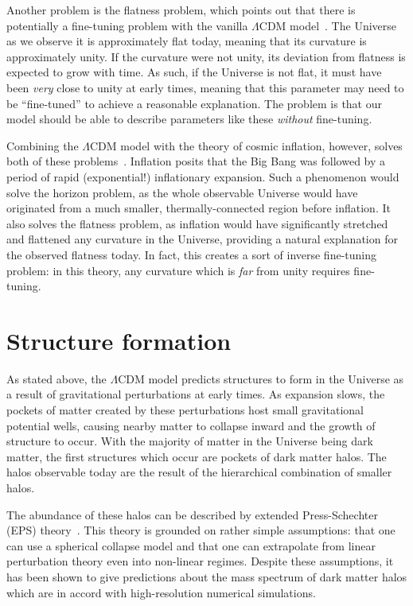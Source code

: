 Another problem is the flatness problem, which points out that there is
potentially a fine-tuning problem with the vanilla \(\Lambda\)CDM
model~\cite{bergstrom_cosmology_2008,schneider_extragalactic_2015}. The
Universe as we observe it is approximately flat today, meaning that its
curvature is approximately unity. If the curvature were not unity, its
deviation from flatness is expected to grow with time. As such, if the
Universe is not flat, it must have been \emph{very} close to unity at early
times, meaning that this parameter may need to be ``fine-tuned'' to achieve a
reasonable explanation. The problem is that our model should be able to
describe parameters like these \emph{without} fine-tuning.

Combining the \(\Lambda\)CDM model with the theory of cosmic inflation,
however, solves both of these problems~\cite{bergstrom_cosmology_2008}.
Inflation posits that the Big Bang was followed by a period of rapid
(exponential!) inflationary expansion. Such a phenomenon would solve the
horizon problem, as the whole observable Universe would have originated from a
much smaller, thermally-connected region before inflation. It also solves the
flatness problem, as inflation would have significantly stretched and
flattened any curvature in the Universe, providing a natural explanation for
the observed flatness today. In fact, this creates a sort of inverse
fine-tuning problem: in this theory, any curvature which is \emph{far} from
unity requires fine-tuning.

\hypertarget{structure-formation}{%
\section{Structure formation}\label{structure-formation}}

As stated above, the \(\Lambda\)CDM model predicts structures to form in
the Universe as a result of gravitational perturbations at early times.
As expansion slows, the pockets of matter created by these perturbations
host small gravitational potential wells, causing nearby matter to
collapse inward and the growth of structure to occur. With the majority
of matter in the Universe being dark matter, the first structures which
occur are pockets of dark matter halos. The halos observable today are
the result of the hierarchical combination of smaller halos.

The abundance of these halos can be described by extended
Press-Schechter (EPS) theory~\cite{bullock_small-scale_2017}. This
theory is grounded on rather simple assumptions: that one can use a
spherical collapse model and that one can extrapolate from linear
perturbation theory even into non-linear regimes. Despite these
assumptions, it has been shown to give predictions about the mass
spectrum of dark matter halos which are in accord with high-resolution
numerical simulations.


